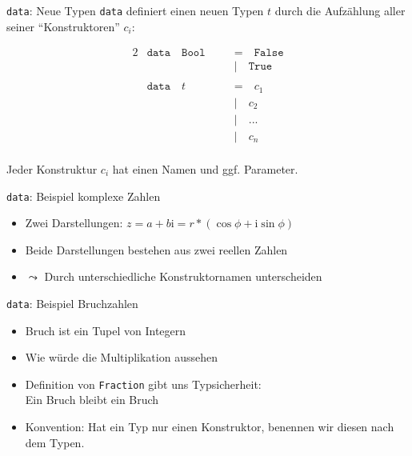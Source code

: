 \documentclass{beamer}
\begin{document}
\begin{frame}{\texttt{data}: Neue Typen}
    \texttt{data} definiert einen neuen Typen $t$ durch die Aufzählung aller seiner \enquote{Konstruktoren} $c_i$:

    \begin{alignat*}{2}
        & \texttt{data} \quad \texttt{Bool} \quad && \texttt{=} \quad \texttt{False} \\
        &               \quad               \quad && \texttt{|} \quad \texttt{True}  \\
        \\
        & \texttt{data} \quad t             \quad && \texttt{=} \quad c_1            \\
        &               \quad               \quad && \texttt{|} \quad c_2            \\
        &               \quad               \quad && \texttt{|} \quad ...            \\
        &               \quad               \quad && \texttt{|} \quad c_n            \\
    \end{alignat*}

    Jeder Konstruktur $c_i$ hat einen Namen und ggf. Parameter.
\end{frame}

\begin{frame}{\texttt{data}: Beispiel komplexe Zahlen}

    \begin{itemize}
        \item Zwei Darstellungen: $z = a + b\text{i} = r * (\cos \phi + \text{i} \sin \phi)$
        \item Beide Darstellungen bestehen aus zwei reellen Zahlen
        \item $\leadsto$ Durch unterschiedliche Konstruktornamen unterscheiden
    \end{itemize}
\end{frame}

\begin{frame}{\texttt{data}: Beispiel Bruchzahlen}
    \begin{itemize}
        \item Bruch ist ein Tupel von Integern
        \item Wie würde die Multiplikation aussehen
    \end{itemize}
    \pause

    \begin{itemize}
        \item Definition von \texttt{Fraction} gibt uns Typsicherheit:\\
              Ein Bruch bleibt ein Bruch
        \item Konvention: Hat ein Typ nur einen Konstruktor, benennen wir diesen nach dem Typen.
    \end{itemize}
\end{frame}
\end{document}
